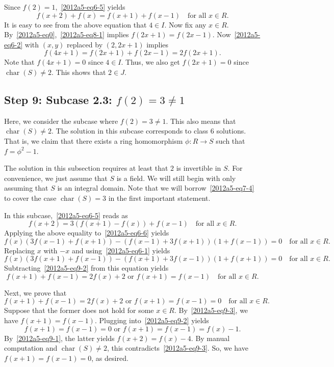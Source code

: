 \documentclass{article}
\DeclareMathOperator{\rchar}{char}
\begin{document}
Since $f(2) = 1$,~\eqref{2012a5-eq6-5} yields
\[ f(x + 2) + f(x) = f(x + 1) + f(x - 1) \quad \text{for all } x \in R. \tag{8.1}\label{2012a5-eq8-1} \]
It is easy to see from the above equation that $4 \in I$.
Now fix any $x \in R$.
By~\eqref{2012a5-eq0},~\eqref{2012a5-eq8-1} implies $f(2x + 1) = f(2x - 1)$.
Now~\eqref{2012a5-eq6-2} with $(x, y)$ replaced by $(2, 2x + 1)$ implies
\[ f(4x + 1) = f(2x + 1) + f(2x - 1) = 2 f(2x + 1). \]
Note that $f(4x + 1) = 0$ since $4 \in I$.
Thus, we also get $f(2x + 1) = 0$ since $\rchar(S) \neq 2$.
This shows that $2 \in J$.









\subsection*{Step 9: Subcase 2.3: $f(2) = 3 \neq 1$}

Here, we consider the subcase where $f(2) = 3 \neq 1$.
This also means that $\rchar(S) \neq 2$.
The solution in this subcase corresponds to class 6 solutions.
That is, we claim that there exists a ring homomorphism $\phi : R \to S$ such that $f = \phi^2 - 1$.

The solution in this subsection requires at least that $2$ is invertible in $S$.
For convenience, we just assume that $S$ is a field.
We will still begin with only assuming that $S$ is an integral domain.
Note that we will borrow~\eqref{2012a5-eq7-4} to cover the case $\rchar(S) = 3$ in the first important statement.

In this subcase,~\eqref{2012a5-eq6-5} reads as
\[ f(x + 2) = 3 (f(x + 1) - f(x)) + f(x - 1) \quad \text{for all } x \in R. \tag{9.1}\label{2012a5-eq9-1} \]
Applying the above equality to~\eqref{2012a5-eq6-6} yields
\[ f(x) (3 f(x - 1) + f(x + 1)) - (f(x - 1) + 3 f(x + 1)) (1 + f (x - 1)) = 0 \quad \text{for all } x \in R. \tag{9.2}\label{2012a5-eq9-2} \]
Replacing $x$ with $-x$ and using~\eqref{2012a5-eq6-1} yields
\[ f(x) (3 f(x + 1) + f(x - 1)) - (f(x + 1) + 3 f(x - 1)) (1 + f (x + 1)) = 0 \quad \text{for all } x \in R. \]
Subtracting~\eqref{2012a5-eq9-2} from this equation yields
\[ f(x + 1) + f(x - 1) = 2 f(x) + 2 \text{ or } f(x + 1) = f(x - 1) \quad \text{for all } x \in R. \tag{9.3}\label{2012a5-eq9-3} \]

Next, we prove that
\[ f(x + 1) + f(x - 1) = 2 f(x) + 2 \text{ or } f(x + 1) = f(x - 1) = 0 \quad \text{for all } x \in R. \tag{9.4}\label{2012a5-eq9-4} \]
Suppose that the former does not hold for some $x \in R$.
By~\eqref{2012a5-eq9-3}, we have $f(x + 1) = f(x - 1)$.
Plugging into~\eqref{2012a5-eq9-2} yields
\[ f(x + 1) = f(x - 1) = 0 \text{ or } f(x + 1) = f(x - 1) = f(x) - 1. \]
By~\eqref{2012a5-eq9-1}, the latter yields $f(x + 2) = f(x) - 4$.
By manual computation and $\rchar(S) \neq 2$, this contradicts~\eqref{2012a5-eq9-3}.
So, we have $f(x + 1) = f(x - 1) = 0$, as desired.
\end{document}
